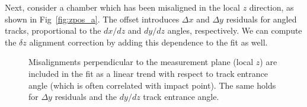 \documentclass[12pt]{article}
\begin{document}
Next, consider a chamber which has been misaligned in the local $z$
direction, as shown in Fig~\ref{fig:zpos_a}.  The offset introduces
$\Delta x$ and $\Delta y$ residuals for angled tracks, proportional to
the $dx/dz$ and $dy/dz$ angles, respectively.  We can compute the
$\delta z$ alignment correction by adding this dependence to the fit
as well.
\begin{figure}
 \hfill {}
\caption{Misalignments perpendicular to the measurement plane (local $z$) are included in the fit as a linear trend with respect to track entrance angle (which is often correlated with impact point).  The same holds for $\Delta y$ residuals and the $dy/dz$ track entrance angle. \label{fig:zpos}}
\end{figure}
\end{document}
